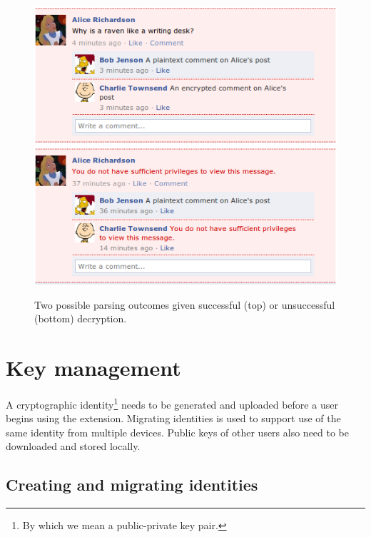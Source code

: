     \begin{figure}[tbph]
        \begin{center}
        
                \includegraphics[width=12cm]{screens/content2.png}
                \includegraphics[width=12cm]{screens/content3.png}

            \caption{Two possible parsing outcomes given successful (top) or unsuccessful (bottom) decryption.}
            \label{scn:ctrl2}
        \end{center}
    \end{figure}
        

\FloatBarrier
\section{Key management}

A cryptographic identity\footnote{By which we mean a public-private key pair.} needs to be generated and uploaded before a user begins using the extension. Migrating identities is used to support use of the same identity from multiple devices. Public keys of other users also need to be downloaded and stored locally.


\subsection{Creating and migrating identities}

